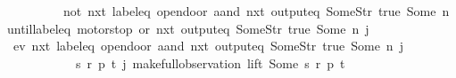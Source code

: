 \begin{isabellebody}
{\ \ \ \ \ \ \ \ \ {\isacharparenleft}{\isacharparenleft}not\ {\isacharparenleft}nxt\ {\isacharparenleft}label{\isacharunderscore}eq\ {\isacharprime}{\isacharprime}opendoor{\isacharprime}{\isacharprime}\ aand\ {\isacharparenleft}nxt\ {\isacharparenleft}output{\isacharunderscore}eq\ {\isacharbrackleft}Some{\isacharparenleft}Str\ {\isacharprime}{\isacharprime}true{\isacharprime}{\isacharprime}{\isacharparenright}{\isacharcomma}\ Some\ n{\isacharbrackright}{\isacharparenright}{\isacharparenright}{\isacharparenright}{\isacharparenright}{\isacharparenright}\ until{\isacharparenleft}{\isacharparenleft}{\isacharparenleft}label{\isacharunderscore}eq\ {\isacharprime}{\isacharprime}motorstop{\isacharprime}{\isacharprime}{\isacharparenright}\ or\ {\isacharparenleft}nxt\ {\isacharparenleft}output{\isacharunderscore}eq\ {\isacharbrackleft}Some{\isacharparenleft}Str\ {\isacharprime}{\isacharprime}true{\isacharprime}{\isacharprime}{\isacharparenright}{\isacharcomma}\ Some\ n{\isacharbrackright}{\isacharparenright}{\isacharparenright}{\isacharparenright}{\isacharparenright}{\isacharparenright}{\isacharparenright}\ j{\isachardoublequoteclose}%
}%
%
\isadelimproof
%
\endisadelimproof
%
\isatagproof
{}\isamarkupfalse%
{\isacharminus}\isanewline
\ \ \isacommand{{\isacharbraceleft}}\isamarkupfalse%
\isamarkupfalse%
\ {\isachardoublequoteopen}{\isacharparenleft}ev\ {\isacharparenleft}nxt\ {\isacharparenleft}{\isacharparenleft}label{\isacharunderscore}eq\ {\isacharprime}{\isacharprime}opendoor{\isacharprime}{\isacharprime}{\isacharparenright}\ aand\ {\isacharparenleft}nxt\ {\isacharparenleft}output{\isacharunderscore}eq\ {\isacharbrackleft}Some{\isacharparenleft}Str\ {\isacharprime}{\isacharprime}true{\isacharprime}{\isacharprime}{\isacharparenright}{\isacharcomma}\ Some\ n{\isacharbrackright}{\isacharparenright}{\isacharparenright}{\isacharparenright}{\isacharparenright}{\isacharparenright}\ j\ {\isasymand}\isanewline
\ \ \ \ \ \ \ \ \ \ \ {\isacharparenleft}{\isasymexists}s\ r\ p\ t{\isachardot}\ j{\isacharequal}\ make{\isacharunderscore}full{\isacharunderscore}observation\ lift\ {\isacharparenleft}Some\ s{\isacharparenright}\ r\ p\ t{\isacharparenright}{\isachardoublequoteclose}\isanewline
\ \ \ \isamarkupfalse%

\end{isabellebody}
